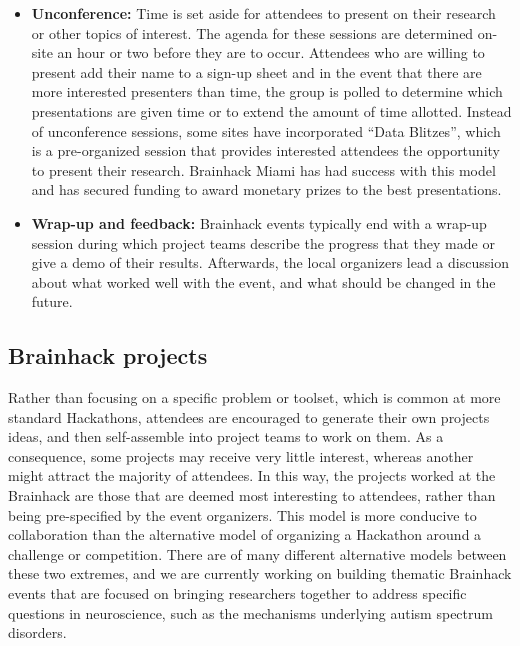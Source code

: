 \documentclass[11pt]{bmc_article_s50}
\begin{document}
\begin{itemize}
\item
  \textbf{Unconference:} Time is set aside for attendees to present on their research or other topics of interest. The agenda for these sessions are determined on-site an hour or two before they are to occur. Attendees who are willing to present add their name to a sign-up sheet and in the event that there are more interested presenters than time, the group is polled to determine which presentations are given time or to extend the amount of time allotted. Instead of unconference sessions, some sites have incorporated ``Data Blitzes'', which is a pre-organized session that provides interested attendees the opportunity to present their research. Brainhack Miami has had success with this model and has secured funding to award monetary prizes to the best presentations.
\item
  \textbf{Wrap-up and feedback:} Brainhack events typically end with a wrap-up session during which project teams describe the progress that they made or give a demo of their results. Afterwards, the local organizers lead a discussion about what worked well with the event, and what should be changed in the future.
\end{itemize}

\subsection{Brainhack projects}\label{project-examples}

Rather than focusing on a specific problem or toolset, which is common at more standard Hackathons, attendees are encouraged to generate their own projects ideas, and then self-assemble into project teams to work on them. As a consequence, some projects may receive very little interest, whereas another might attract the majority of attendees. In this way, the projects worked at the Brainhack are those that are deemed most interesting to attendees, rather than being pre-specified by the event organizers. This model is more conducive to collaboration than the alternative model of organizing a Hackathon around a challenge or competition. There are of many different alternative models between these two extremes, and we are currently working on building thematic Brainhack events that are focused on bringing researchers together to address specific questions in neuroscience, such as the mechanisms underlying autism spectrum disorders.  
\end{document}
